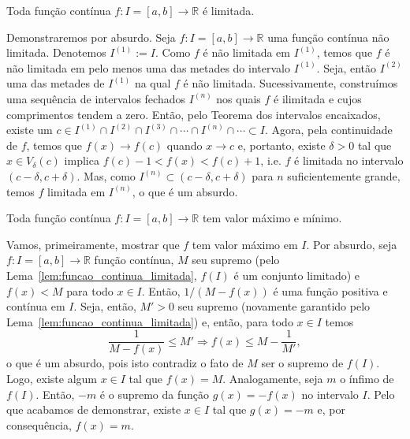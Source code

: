 \begin{lem}\label{lem:funcao_continua_limitada}
  Toda função contínua $f:I=[a, b]\to \mathbb{R}$ é limitada.
\end{lem}
\begin{dem}
  Demonstraremos por absurdo. Seja $f:I=[a, b]\to\mathbb{R}$ uma função contínua não limitada. Denotemos $I^{(1)} := I$. Como $f$ é não limitada em $I^{(1)}$, temos que $f$ é não limitada em pelo menos uma das metades do intervalo $I^{(1)}$. Seja, então $I^{(2)}$ uma das metades de $I^{(1)}$ na qual $f$ é não limitada. Sucessivamente, construímos uma sequência de intervalos fechados $I^{(n)}$ nos quais $f$ é ilimitada e cujos comprimentos tendem a zero. Então, pelo Teorema dos intervalos encaixados, existe um $c\in I^{(1)}\cap I^{(2)}\cap I^{(3)}\cap \cdots \cap I^{(n)}\cap \cdots \subset I$. Agora, pela continuidade de $f$, temos que $f(x)\to f(c)$ quando $x\to c$ e, portanto, existe $\delta>0$ tal que $x\in V_\delta(c)$ implica $f(c)-1 < f(x) < f(c)+1$, i.e. $f$ é limitada no intervalo $(c-\delta, c+\delta)$. Mas, como $I^{(n)}\subset (c-\delta, c+\delta)$ para $n$ suficientemente grande, temos $f$ limitada em $I^{(n)}$, o que é um absurdo.
\end{dem}

\begin{teo}\label{teo:funcao_continua_valores_extremos}
  Toda função contínua $f:I=[a, b]\to\mathbb{R}$ tem valor máximo e mínimo.
\end{teo}
\begin{dem}
  Vamos, primeiramente, mostrar que $f$ tem valor máximo em $I$. Por absurdo, seja $f:I=[a, b]\to\mathbb{R}$ função contínua, $M$ seu supremo (pelo Lema~\ref{lem:funcao_continua_limitada}, $f(I)$ é um conjunto limitado) e $f(x)<M$ para todo $x\in I$. Então, $1/(M-f(x))$ é uma função positiva e contínua em $I$. Seja, então, $M'>0$ seu supremo (novamente garantido pelo Lema~\ref{lem:funcao_continua_limitada}) e, então, para todo $x\in I$ temos
  \begin{equation}
    \frac{1}{M-f(x)}\leq M' \Rightarrow f(x) \leq M - \frac{1}{M'},
  \end{equation}
o que é um absurdo, pois isto contradiz o fato de $M$ ser o supremo de $f(I)$. Logo, existe algum $x\in I$ tal que $f(x)=M$. Analogamente, seja $m$ o ínfimo de $f(I)$. Então, $-m$ é o supremo da função $g(x) = -f(x)$ no intervalo $I$. Pelo que acabamos de demonstrar, existe $x\in I$ tal que $g(x)=-m$ e, por consequência, $f(x) = m$.
\end{dem}

